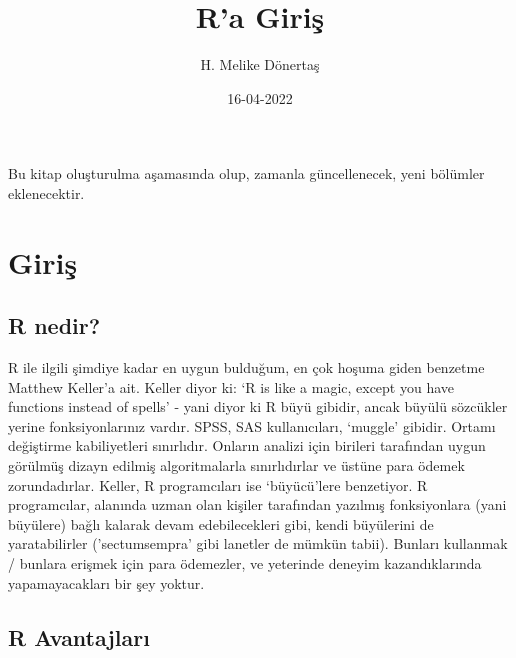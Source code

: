 \documentclass[
]{book}
\title{R'a Giriş}
\author{H. Melike Dönertaş}
\date{16-04-2022}
\begin{document}
\maketitle

{
\setcounter{tocdepth}{1}
\tableofcontents
}
\hypertarget{section}{%
\chapter*{}\label{section}}

Bu kitap oluşturulma aşamasında olup, zamanla güncellenecek, yeni bölümler eklenecektir.

\hypertarget{Giris}{%
\chapter{Giriş}\label{Giris}}

\hypertarget{r-nedir}{%
\section{R nedir?}\label{r-nedir}}

R ile ilgili şimdiye kadar en uygun bulduğum, en çok hoşuma giden benzetme Matthew Keller'a ait. Keller diyor ki: `R is like a magic, except you have functions instead of spells' - yani diyor ki R büyü gibidir, ancak büyülü sözcükler yerine fonksiyonlarınız vardır. SPSS, SAS kullanıcıları, `muggle' gibidir. Ortamı değiştirme kabiliyetleri sınırlıdır. Onların analizi için birileri tarafından uygun görülmüş dizayn edilmiş algoritmalarla sınırlıdırlar ve üstüne para ödemek zorundadırlar. Keller, R programcıları ise `büyücü'lere benzetiyor. R programcılar, alanında uzman olan kişiler tarafından yazılmış fonksiyonlara (yani büyülere) bağlı kalarak devam edebilecekleri gibi, kendi büyülerini de yaratabilirler ('sectumsempra' gibi lanetler de mümkün tabii). Bunları kullanmak / bunlara erişmek için para ödemezler, ve yeterinde deneyim kazandıklarında yapamayacakları bir şey yoktur.

\hypertarget{r-avantajlarux131}{%
\section{R Avantajları}\label{r-avantajlarux131}}
\end{document}
